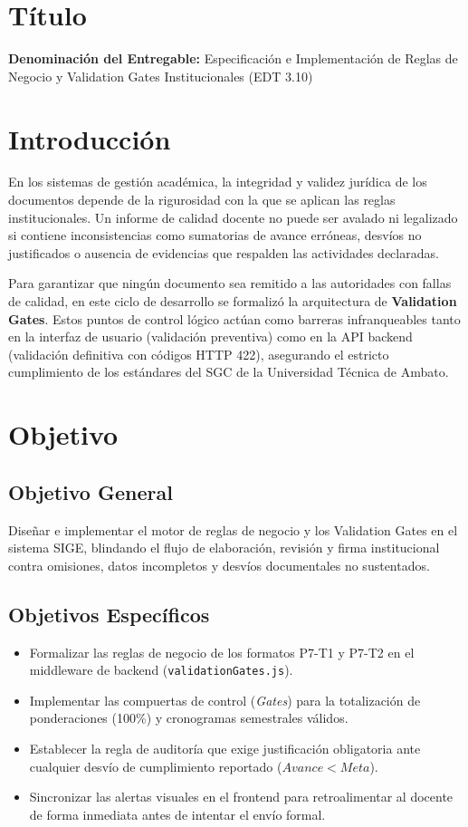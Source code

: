 \documentclass[12pt,a4paper]{article}
\begin{document}
\section{Título}
\textbf{Denominación del Entregable:} Especificación e Implementación de Reglas de Negocio y Validation Gates Institucionales (EDT 3.10)

\section{Introducción}
En los sistemas de gestión académica, la integridad y validez jurídica de los documentos depende de la rigurosidad con la que se aplican las reglas institucionales. Un informe de calidad docente no puede ser avalado ni legalizado si contiene inconsistencias como sumatorias de avance erróneas, desvíos no justificados o ausencia de evidencias que respalden las actividades declaradas.

Para garantizar que ningún documento sea remitido a las autoridades con fallas de calidad, en este ciclo de desarrollo se formalizó la arquitectura de \textbf{Validation Gates}. Estos puntos de control lógico actúan como barreras infranqueables tanto en la interfaz de usuario (validación preventiva) como en la API backend (validación definitiva con códigos HTTP 422), asegurando el estricto cumplimiento de los estándares del SGC de la Universidad Técnica de Ambato.

\section{Objetivo}

\subsection{Objetivo General}
Diseñar e implementar el motor de reglas de negocio y los Validation Gates en el sistema SIGE, blindando el flujo de elaboración, revisión y firma institucional contra omisiones, datos incompletos y desvíos documentales no sustentados.

\subsection{Objetivos Específicos}
\begin{itemize}[leftmargin=1.5em, itemsep=1.5pt]
    \item Formalizar las reglas de negocio de los formatos P7-T1 y P7-T2 en el middleware de backend (\texttt{validationGates.js}).
    \item Implementar las compuertas de control (\textit{Gates}) para la totalización de ponderaciones (100\%) y cronogramas semestrales válidos.
    \item Establecer la regla de auditoría que exige justificación obligatoria ante cualquier desvío de cumplimiento reportado ($Avance < Meta$).
    \item Sincronizar las alertas visuales en el frontend para retroalimentar al docente de forma inmediata antes de intentar el envío formal.
\end{itemize}
\end{document}
